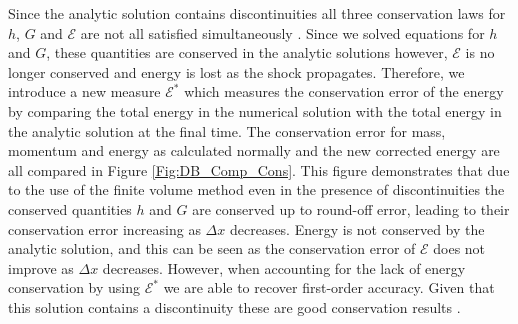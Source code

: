 \documentclass[10pt]{elsarticle}
\begin{document}
Since the analytic solution contains discontinuities all three conservation laws for $h$, $G$ and $\mathcal{E}$ are not all satisfied simultaneously \cite{Pu-2018-1361}. Since we solved equations for $h$ and $G$, these quantities are conserved in the analytic solutions however, $\mathcal{E}$ is no longer conserved and energy is lost as the shock propagates. Therefore, we introduce a new measure $\mathcal{E}^*$ which measures the conservation error of the energy by comparing the total energy in the numerical solution with the total energy in the analytic solution at the final time. The conservation error for mass, momentum and energy as calculated normally and the new corrected energy are all compared in Figure \ref{Fig:DB_Comp_Cons}. This figure demonstrates that due to the use of the finite volume method even in the presence of discontinuities the conserved quantities $h$ and $G$ are conserved up to round-off error, leading to their conservation error increasing as $\Delta x$ decreases. Energy is not conserved by the analytic solution, and this can be seen as the conservation error of $\mathcal{E}$ does not improve as $\Delta x$ decreases. However, when accounting for the lack of energy conservation by using $\mathcal{E}^*$ we are able to recover first-order accuracy. Given that this solution contains a discontinuity these are good conservation results \cite{Shu-2012-59-5}. 
%
\end{document}
